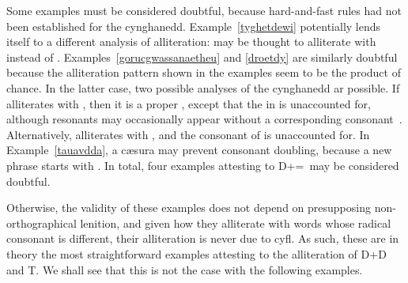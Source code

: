 Some examples must be considered doubtful, because hard-and-fast rules had not been established for the cynghanedd. Example~\ref{tyghetdewi} potentially lends itself to a different analysis of alliteration:  may be thought to alliterate with  instead of . Examples~\ref{gorucgwassanaetheu} and \ref{droetdy} are similarly doubtful because the alliteration pattern shown in the examples seem to be the product of chance. In the latter case, two possible analyses of the cynghanedd ar possible. If  alliterates with , then it is a proper , except that the  in  is unaccounted for, although resonants may occasionally appear without a corresponding consonant~\parencite[203--07]{jones_meddwl_2005}. Alternatively,   alliterates with , and the consonant of  is unaccounted for. In Example~\ref{tauavdda}, a c\ae sura may prevent consonant doubling, because a new phrase starts with . In total, four examples attesting to \gls{D}+\xD=\xT\ may be considered doubtful.

Otherwise, the validity of these examples does not depend on presupposing non-orthographical lenition, and given how they alliterate with words whose radical consonant is different, their alliteration is never due to \gls{cyfl}. As such, these are in theory the most straightforward examples attesting to the alliteration of \gls{D}+\gls{D} and \gls{T}.  We shall see that this is not the case with the following examples.



